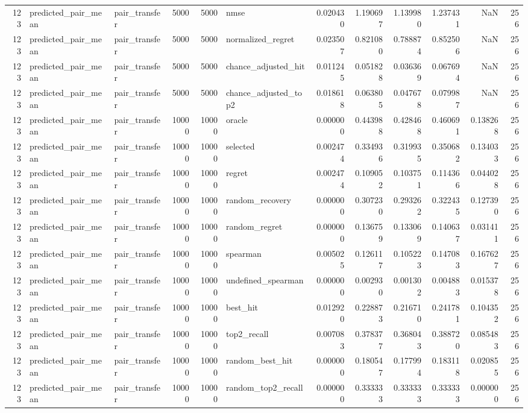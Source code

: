 \begin{tabular}{rllrrlrrrrrr}
123 & predicted_pair_mean & pair_transfer & 5000 & 5000 & nmse & 0.020430 & 1.190697 & 1.139980 & 1.237431 & NaN & 256 \\
123 & predicted_pair_mean & pair_transfer & 5000 & 5000 & normalized_regret & 0.023507 & 0.821080 & 0.788874 & 0.852506 & NaN & 256 \\
123 & predicted_pair_mean & pair_transfer & 5000 & 5000 & chance_adjusted_hit & 0.011245 & 0.051828 & 0.036369 & 0.067694 & NaN & 256 \\
123 & predicted_pair_mean & pair_transfer & 5000 & 5000 & chance_adjusted_top2 & 0.018618 & 0.063805 & 0.047678 & 0.079987 & NaN & 256 \\
123 & predicted_pair_mean & pair_transfer & 10000 & 10000 & oracle & 0.000000 & 0.443988 & 0.428468 & 0.460691 & 0.138268 & 256 \\
123 & predicted_pair_mean & pair_transfer & 10000 & 10000 & selected & 0.002474 & 0.334936 & 0.319935 & 0.350682 & 0.134033 & 256 \\
123 & predicted_pair_mean & pair_transfer & 10000 & 10000 & regret & 0.002474 & 0.109052 & 0.103751 & 0.114366 & 0.044028 & 256 \\
123 & predicted_pair_mean & pair_transfer & 10000 & 10000 & random_recovery & 0.000000 & 0.307230 & 0.293262 & 0.322435 & 0.127390 & 256 \\
123 & predicted_pair_mean & pair_transfer & 10000 & 10000 & random_regret & 0.000000 & 0.136759 & 0.133069 & 0.140637 & 0.031411 & 256 \\
123 & predicted_pair_mean & pair_transfer & 10000 & 10000 & spearman & 0.005025 & 0.126117 & 0.105223 & 0.147083 & 0.167627 & 256 \\
123 & predicted_pair_mean & pair_transfer & 10000 & 10000 & undefined_spearman & 0.000000 & 0.002930 & 0.001302 & 0.004883 & 0.015378 & 256 \\
123 & predicted_pair_mean & pair_transfer & 10000 & 10000 & best_hit & 0.012920 & 0.228873 & 0.216710 & 0.241781 & 0.104352 & 256 \\
123 & predicted_pair_mean & pair_transfer & 10000 & 10000 & top2_recall & 0.007083 & 0.378377 & 0.368043 & 0.388720 & 0.085483 & 256 \\
123 & predicted_pair_mean & pair_transfer & 10000 & 10000 & random_best_hit & 0.000000 & 0.180547 & 0.177994 & 0.183118 & 0.020855 & 256 \\
123 & predicted_pair_mean & pair_transfer & 10000 & 10000 & random_top2_recall & 0.000000 & 0.333333 & 0.333333 & 0.333333 & 0.000000 & 256 \\

\end{tabular}
